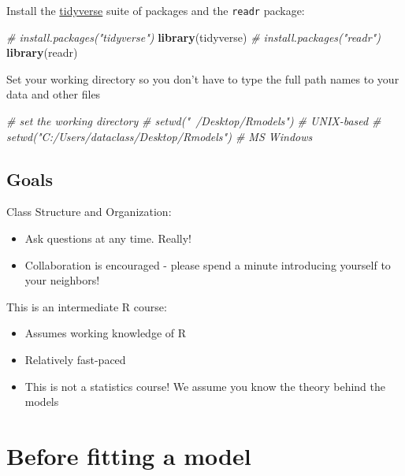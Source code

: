 \documentclass[]{book}
\newenvironment{Shaded}{\begin{snugshade}}{\end{snugshade}}
\newcommand{\KeywordTok}[1]{\textcolor[rgb]{0.13,0.29,0.53}{\textbf{#1}}}
\newcommand{\CommentTok}[1]{\textcolor[rgb]{0.56,0.35,0.01}{\textit{#1}}}
\newcommand{\NormalTok}[1]{#1}
\providecommand{\tightlist}{%
  \setlength{\itemsep}{0pt}\setlength{\parskip}{0pt}}
\begin{document}
Install the \href{https://www.tidyverse.org/}{tidyverse} suite of
packages and the \texttt{readr} package:

\begin{Shaded}
\begin{Highlighting}[]
\CommentTok{# install.packages("tidyverse")}
\KeywordTok{library}\NormalTok{(tidyverse)}
\CommentTok{# install.packages("readr")}
\KeywordTok{library}\NormalTok{(readr)}
\end{Highlighting}
\end{Shaded}

Set your working directory so you don't have to type the full path names
to your data and other files

\begin{Shaded}
\begin{Highlighting}[]
  \CommentTok{# set the working directory}
  \CommentTok{# setwd("~/Desktop/Rmodels") # UNIX-based}
  \CommentTok{# setwd("C:/Users/dataclass/Desktop/Rmodels") # MS Windows}
\end{Highlighting}
\end{Shaded}

\subsection{Goals}\label{goals-1}

Class Structure and Organization:

\begin{itemize}
\tightlist
\item
  Ask questions at any time. Really!
\item
  Collaboration is encouraged - please spend a minute introducing
  yourself to your neighbors!
\end{itemize}

This is an intermediate R course:

\begin{itemize}
\tightlist
\item
  Assumes working knowledge of R
\item
  Relatively fast-paced
\item
  This is not a statistics course! We assume you know the theory behind
  the models
\end{itemize}

\section{Before fitting a model}\label{before-fitting-a-model}
\end{document}
